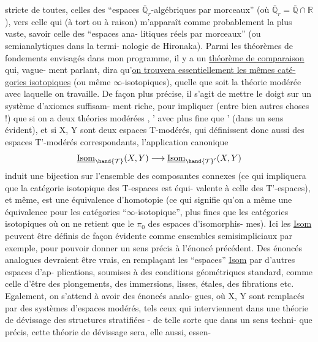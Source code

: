 
stricte de toutes, celles des ``espaces $\bar{\mathbb{Q}}_r$-algébriques par morceaux''
(où $\bar{\mathbb{Q}}_r = \bar{\mathbb{Q}} \cap \mathbb{R}$), vers celle qui (à tort ou à raison) m'apparaît
comme probablement la plus vaste, savoir celle des ``espaces ana-%
litiques réels par morceaux'' (ou semianalytiques dans la termi-%
nologie de Hironaka). Parmi les théorèmes de fondements envisagés
dans mon programme, il y a un \uline{théorème de comparaison} qui, vague-%
ment parlant, dira qu'\uline{on trouvera essentiellement les mêmes caté-%
gories isotopiques} (ou même $\infty$-isotopiques), quelle que soit la
théorie modérée avec laquelle on travaille. De façon plus précise,
il s'agit de mettre le doigt sur un système d'axiomes suffisam-%
ment riche, pour impliquer (entre bien autres choses !) que si on
a deux théories modérées , ' avec  plus fine que ' (dans
un sens évident), et si X, Y sont deux espaces T-modérés, qui
définissent donc aussi des espaces T'-modérés correspondants,
l'application canonique
\[ \underline{\mathrm{Isom}}_{\hand{\mathcal{T}}}(X,Y) \longrightarrow \underline{\mathrm{Isom}}_{\hand{\mathcal{T}}'}(X,Y) \]
induit une bijection sur l'ensemble des composantes connexes (ce
qui impliquera que la catégorie isotopique des T-espaces est équi-%
valente à celle des T'-espaces), et même, est une équivalence
d'homotopie (ce qui signifie qu'on a même une équivalence pour
les catégories ``$\infty$-isotopique'', plus fines que les catégories
isotopiques où on ne retient que le $\pi_0$ des espaces d'isomorphis-%
mes). Ici les \uline{Isom} peuvent être définis de façon évidente comme
ensembles semisimpliciaux par exemple, pour pouvoir donner un sens
précis à l'énoncé précédent. Des énoncés analogues devraient être
vrais, en remplaçant les ``espaces'' \uline{Isom} par d'autres espaces d'ap-%
plications, soumises à des conditions géométriques standard, comme
celle d'être des plongements, des immersions, lisses, étales, des
fibrations etc. Egalement, on s'attend à avoir des énoncés analo-%
gues, où X, Y sont remplacés par des systèmes d'espaces modérés,
tels ceux qui interviennent dans une théorie de dévissage des
structures stratifiées - de telle sorte que dans un sens techni-%
que précis, cette théorie de dévissage sera, elle aussi, essen-%

